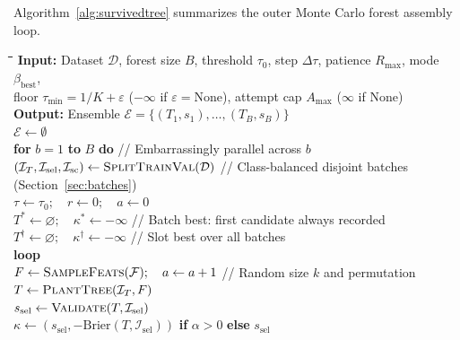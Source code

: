 \documentclass[11pt,a4paper]{article}
\newcommand{\code}[1]{\texttt{#1}}
\newcommand{\algkw}[1]{\textbf{#1}}
\newcommand{\algfn}[1]{\textsc{#1}}
\newcommand{\algcm}[1]{\quad\textcolor{MutedGray}{\footnotesize // #1}}
\begin{document}
Algorithm~\ref{alg:survivedtree} summarizes the outer Monte Carlo forest assembly loop.

\begin{algorithm}[htbp]
  \caption{Monte Carlo Tree Selection (\code{SurvivedTree}) and Forest Assembly}
  \label{alg:survivedtree}
  \small
  \begin{tabbing}
    \hspace{1.2em}\=\hspace{1.2em}\=\hspace{1.2em}\=\hspace{1.2em}\=\hspace{1.2em}\=\kill
    \textbf{Input:} Dataset $\mathcal{D}$, forest size $B$, threshold $\tau_0$, step $\Delta\tau$, patience $R_{\max}$, mode $\beta_{\text{best}}$, \\
    \> floor $\tau_{\min} = 1/K + \varepsilon$ ($-\infty$ if $\varepsilon = {}$None), attempt cap $A_{\max}$ ($\infty$ if None) \\
    \textbf{Output:} Ensemble $\mathcal{E} = \{(T_1, s_1), \dots, (T_B, s_B)\}$ \\[4pt]
    $\mathcal{E} \gets \emptyset$ \\
    \algkw{for} $b = 1$ \algkw{to} $B$ \algkw{do} \algcm{Embarrassingly parallel across $b$} \\
    \> $(\mathcal{I}_T, \mathcal{I}_{\text{sel}}, \mathcal{I}_{\text{sc}}) \gets \text{\algfn{SplitTrainVal}}(\mathcal{D})$ \algcm{Class-balanced disjoint batches (Section~\ref{sec:batches})} \\
    \> $\tau \gets \tau_0; \quad r \gets 0; \quad a \gets 0$ \\
    \> $T^* \gets \varnothing; \quad \kappa^* \gets -\infty$ \algcm{Batch best: first candidate always recorded} \\
    \> $T^{\dagger} \gets \varnothing; \quad \kappa^{\dagger} \gets -\infty$ \algcm{Slot best over all batches} \\[2pt]
    \> \algkw{loop} \\
    \> \> $F \gets \text{\algfn{SampleFeats}}(\mathcal{F}); \quad a \gets a + 1$ \algcm{Random size $k$ and permutation} \\
    \> \> $T \gets \text{\algfn{PlantTree}}(\mathcal{I}_T, F)$ \\
    \> \> $s_{\text{sel}} \gets \text{\algfn{Validate}}(T, \mathcal{I}_{\text{sel}})$ \\
    \> \> $\kappa \gets (s_{\text{sel}}, -\text{Brier}(T, \mathcal{I}_{\text{sel}}))$ \algkw{if} $\alpha > 0$ \algkw{else} $s_{\text{sel}}$ \\

\end{tabbing}
\end{algorithm}
\end{document}
